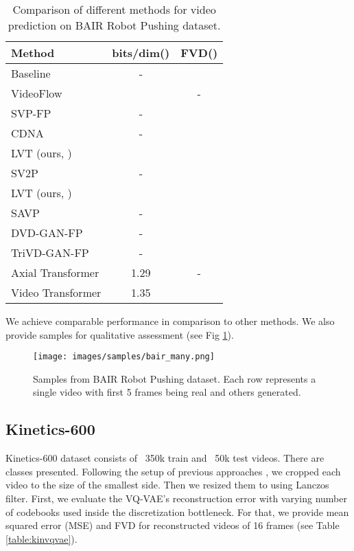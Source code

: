 \documentclass{article}
\begin{document}
\begin{table}[!hbtp]
\centering
\caption{Comparison of different methods for video prediction on BAIR Robot Pushing dataset.}
\begin{tabular}{lcc}
\hline
\textbf{Method}          & \textbf{bits/dim}()        & \textbf{FVD}()     \\ \hline
Baseline & - &  \\
VideoFlow \cite{kumar} &  & -   \\
SVP-FP \cite{denton2018stochastic}                 & - &    \\
CDNA \cite{finn2016unsupervised}                   & - &    \\
LVT (ours, ) &  &  \\ 
SV2P \cite{sv2p}                   & - &    \\
LVT (ours, ) &  &  \\
SAVP \cite{savp}                    & - &    \\
DVD-GAN-FP \cite{dvdgan}             & - &    \\
TriVD-GAN-FP  \cite{dvdgan2}           & - &    \\
Axial Transformer \cite{axial_transformer}     & 1.29 & -   \\
Video Transformer \cite{vt}       & 1.35 &  \\ \hline
\end{tabular}
\label{table:BAIRbench}
\end{table}

We achieve comparable performance in comparison to other methods. We also provide samples for qualitative assessment (see Fig \ref{fig:BAIR_samples}).

\begin{figure}[!hbtp]
\centering
\texttt{[image: images/samples/bair\_many.png]}
\caption{Samples from BAIR Robot Pushing dataset. Each row represents a single video with first 5 frames being real and others generated.}\label{fig:BAIR_samples}
\end{figure}

\subsection{Kinetics-600}



Kinetics-600 \cite{kinetics600_dataset} dataset consists of ~350k train and ~50k test videos. There are  classes presented. Following the setup of previous approaches \cite{vt, dvdgan, dvdgan2}, we cropped each video to the size of the smallest side. Then we resized them to  using Lanczos filter. First, we evaluate the VQ-VAE's reconstruction error with varying number of codebooks used inside the discretization bottleneck. For that, we provide mean squared error (MSE) and FVD for reconstructed videos of 16 frames (see Table \ref{table:kinvqvae}).
\end{document}
